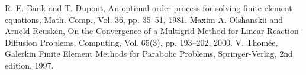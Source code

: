 \documentclass{report}
\begin{document}
\begin{thebibliography}{9}
 R. E. Bank and T. Dupont, An optimal order process for
solving finite element equations, Math. Comp., Vol. 36, pp. 35--51,
1981.
 Maxim A. Olshanskii and Arnold
Reusken, On the Convergence of a Multigrid Method for Linear
Reaction-Diffusion Problems, Computing, Vol. 65(3), pp. 193--202,
2000.
 V. Thom\'{e}e, Galerkin Finite Element Methods for
Parabolic Problems, Springer-Verlag, 2nd edition, 1997.



\end{thebibliography}
\end{document}
